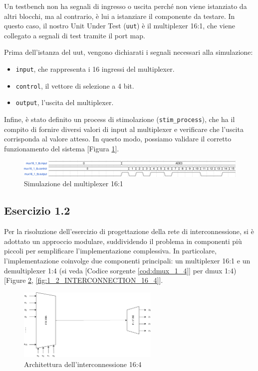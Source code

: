 Un testbench non ha segnali di ingresso o uscita perché non viene istanziato da altri blocchi, ma al contrario, è lui a istanziare il componente da testare. In questo caso, il nostro Unit Under Test (\texttt{uut}) è il multiplexer 16:1, che viene collegato a segnali di test tramite il port map.

Prima dell’istanza del uut, vengono dichiarati i segnali necessari alla simulazione:

\begin{itemize}
    \item \texttt{input}, che rappresenta i 16 ingressi del multiplexer.
    \item \texttt{control}, il vettore di selezione a 4 bit.
    \item \texttt{output}, l’uscita del multiplexer.
\end{itemize}

Infine, è stato definito un process di stimolazione (\texttt{stim\_process}), che ha il compito di fornire diversi valori di input al multiplexer e verificare che l’uscita corrisponda al valore atteso. In questo modo, possiamo validare il corretto funzionamento del sistema [Figura \ref{fig:mux16_1_tb}].

\begin{figure}[h]
    \centering
    \includegraphics[width=\textwidth]{img/mux16_1_tb.pdf}
    \caption{Simulazione del multiplexer 16:1}
    \label{fig:mux16_1_tb}
\end{figure}

\subsection{Esercizio 1.2}
Per la risoluzione dell'esercizio di progettazione della rete di interconnessione, si è adottato un approccio modulare, suddividendo il problema in componenti più piccoli per semplificare l'implementazione complessiva. In particolare, l'implementazione coinvolge due componenti principali: un multiplexer 16:1 e un demultiplexer 1:4 (si veda [Codice sorgente \ref{cod:dmux_1_4}] per dmux 1:4) [Figure \ref{fig:interconnection16_4}, \ref{fig:1_2_INTERCONNECTION_16_4}].

\begin{figure}[h]
    \centering
    \includegraphics[width=0.6\textwidth]{img/interconnection16_4.pdf}
    \caption{Architettura dell'interconnessione 16:4}
    \label{fig:interconnection16_4}
\end{figure}

